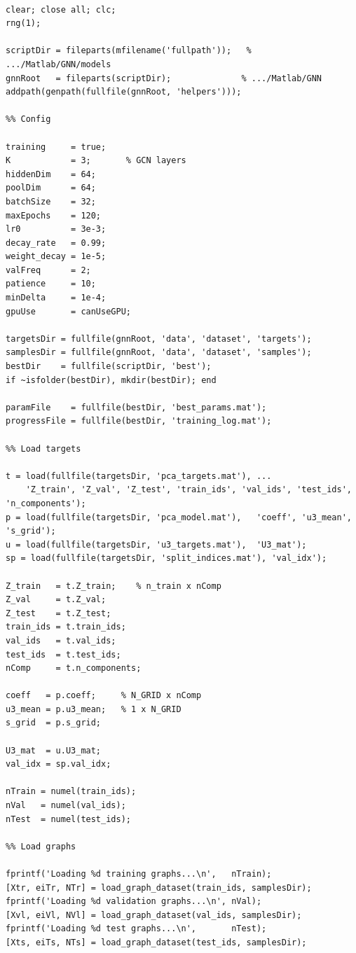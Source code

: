 \documentclass[11pt]{article}
\begin{document}
\begin{lstlisting}[caption={\texttt{models/Main.m}}]
%% GNN to predict spinodoid sheet deformation (8-dim PCA target)

clear; close all; clc;
rng(1);

scriptDir = fileparts(mfilename('fullpath'));   % .../Matlab/GNN/models
gnnRoot   = fileparts(scriptDir);              % .../Matlab/GNN
addpath(genpath(fullfile(gnnRoot, 'helpers')));

%% Config

training     = true;
K            = 3;       % GCN layers
hiddenDim    = 64;
poolDim      = 64;
batchSize    = 32;
maxEpochs    = 120;
lr0          = 3e-3;
decay_rate   = 0.99;
weight_decay = 1e-5;
valFreq      = 2;
patience     = 10;
minDelta     = 1e-4;
gpuUse       = canUseGPU;

targetsDir = fullfile(gnnRoot, 'data', 'dataset', 'targets');
samplesDir = fullfile(gnnRoot, 'data', 'dataset', 'samples');
bestDir    = fullfile(scriptDir, 'best');
if ~isfolder(bestDir), mkdir(bestDir); end

paramFile    = fullfile(bestDir, 'best_params.mat');
progressFile = fullfile(bestDir, 'training_log.mat');

%% Load targets

t = load(fullfile(targetsDir, 'pca_targets.mat'), ...
    'Z_train', 'Z_val', 'Z_test', 'train_ids', 'val_ids', 'test_ids', 'n_components');
p = load(fullfile(targetsDir, 'pca_model.mat'),   'coeff', 'u3_mean', 's_grid');
u = load(fullfile(targetsDir, 'u3_targets.mat'),  'U3_mat');
sp = load(fullfile(targetsDir, 'split_indices.mat'), 'val_idx');

Z_train   = t.Z_train;    % n_train x nComp
Z_val     = t.Z_val;
Z_test    = t.Z_test;
train_ids = t.train_ids;
val_ids   = t.val_ids;
test_ids  = t.test_ids;
nComp     = t.n_components;

coeff   = p.coeff;     % N_GRID x nComp
u3_mean = p.u3_mean;   % 1 x N_GRID
s_grid  = p.s_grid;

U3_mat  = u.U3_mat;
val_idx = sp.val_idx;

nTrain = numel(train_ids);
nVal   = numel(val_ids);
nTest  = numel(test_ids);

%% Load graphs

fprintf('Loading %d training graphs...\n',   nTrain);
[Xtr, eiTr, NTr] = load_graph_dataset(train_ids, samplesDir);
fprintf('Loading %d validation graphs...\n', nVal);
[Xvl, eiVl, NVl] = load_graph_dataset(val_ids, samplesDir);
fprintf('Loading %d test graphs...\n',       nTest);
[Xts, eiTs, NTs] = load_graph_dataset(test_ids, samplesDir);


\end{lstlisting}
\end{document}
